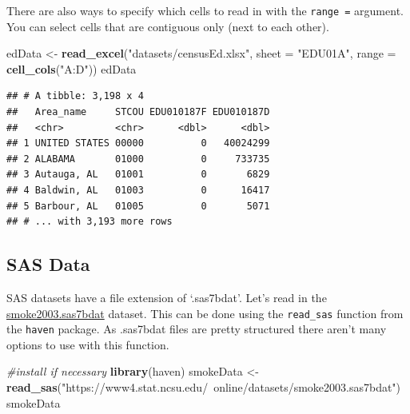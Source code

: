 \documentclass[
]{book}
\newenvironment{Shaded}{\begin{snugshade}}{\end{snugshade}}
\newcommand{\CommentTok}[1]{\textcolor[rgb]{0.56,0.35,0.01}{\textit{#1}}}
\newcommand{\DataTypeTok}[1]{\textcolor[rgb]{0.13,0.29,0.53}{#1}}
\newcommand{\KeywordTok}[1]{\textcolor[rgb]{0.13,0.29,0.53}{\textbf{#1}}}
\newcommand{\NormalTok}[1]{#1}
\newcommand{\StringTok}[1]{\textcolor[rgb]{0.31,0.60,0.02}{#1}}
\theoremstyle{definition}
\theoremstyle{definition}
\theoremstyle{definition}
\theoremstyle{remark}
\begin{document}
There are also ways to specify which cells to read in with the \texttt{range\ =} argument. You can select cells that are contiguous only (next to each other).

\begin{Shaded}
\begin{Highlighting}[]
\NormalTok{edData <-}\StringTok{ }\KeywordTok{read_excel}\NormalTok{(}\StringTok{"datasets/censusEd.xlsx"}\NormalTok{, }\DataTypeTok{sheet =} \StringTok{"EDU01A"}\NormalTok{, }
                   \DataTypeTok{range =} \KeywordTok{cell_cols}\NormalTok{(}\StringTok{"A:D"}\NormalTok{))}
\NormalTok{edData}
\end{Highlighting}
\end{Shaded}

\begin{verbatim}
## # A tibble: 3,198 x 4
##   Area_name     STCOU EDU010187F EDU010187D
##   <chr>         <chr>      <dbl>      <dbl>
## 1 UNITED STATES 00000          0   40024299
## 2 ALABAMA       01000          0     733735
## 3 Autauga, AL   01001          0       6829
## 4 Baldwin, AL   01003          0      16417
## 5 Barbour, AL   01005          0       5071
## # ... with 3,193 more rows
\end{verbatim}

\hypertarget{sas-data}{%
\subsection{SAS Data}\label{sas-data}}

SAS datasets have a file extension of `.sas7bdat'. Let's read in the \href{https://www4.stat.ncsu.edu/~online/datasets/smoke2003.sas7bdat}{smoke2003.sas7bdat} dataset. This can be done using the \texttt{read\_sas} function from the \texttt{haven} package. As .sas7bdat files are pretty structured there aren't many options to use with this function.

\begin{Shaded}
\begin{Highlighting}[]
\CommentTok{#install if necessary}
\KeywordTok{library}\NormalTok{(haven)}
\NormalTok{smokeData <-}\StringTok{ }\KeywordTok{read_sas}\NormalTok{(}\StringTok{"https://www4.stat.ncsu.edu/~online/datasets/smoke2003.sas7bdat"}\NormalTok{)}
\NormalTok{smokeData}
\end{Highlighting}
\end{Shaded}
\end{document}
